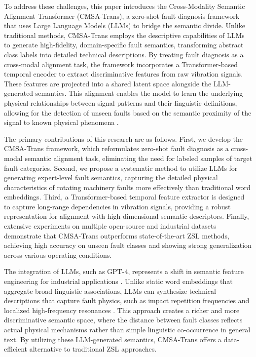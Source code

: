 To address these challenges, this paper introduces the Cross-Modality Semantic Alignment Transformer (CMSA-Trans), a zero-shot fault diagnosis framework that uses Large Language Models (LLMs) to bridge the semantic divide. Unlike traditional methods, CMSA-Trans employs the descriptive capabilities of LLMs to generate high-fidelity, domain-specific fault semantics, transforming abstract class labels into detailed technical descriptions. By treating fault diagnosis as a cross-modal alignment task, the framework incorporates a Transformer-based temporal encoder to extract discriminative features from raw vibration signals. These features are projected into a shared latent space alongside the LLM-generated semantics. This alignment enables the model to learn the underlying physical relationships between signal patterns and their linguistic definitions, allowing for the detection of unseen faults based on the semantic proximity of the signal to known physical phenomena \cite{vaswani2017attention, radford2021learning}.

The primary contributions of this research are as follows. First, we develop the CMSA-Trans framework, which reformulates zero-shot fault diagnosis as a cross-modal semantic alignment task, eliminating the need for labeled samples of target fault categories. Second, we propose a systematic method to utilize LLMs for generating expert-level fault semantics, capturing the detailed physical characteristics of rotating machinery faults more effectively than traditional word embeddings. Third, a Transformer-based temporal feature extractor is designed to capture long-range dependencies in vibration signals, providing a robust representation for alignment with high-dimensional semantic descriptors. Finally, extensive experiments on multiple open-source and industrial datasets demonstrate that CMSA-Trans outperforms state-of-the-art ZSL methods, achieving high accuracy on unseen fault classes and showing strong generalization across various operating conditions.

The integration of LLMs, such as GPT-4, represents a shift in semantic feature engineering for industrial applications \cite{bubeck2023sparks}. Unlike static word embeddings that aggregate broad linguistic associations, LLMs can synthesize technical descriptions that capture fault physics, such as impact repetition frequencies and localized high-frequency resonances \cite{brown2020language}. This approach creates a richer and more discriminative semantic space, where the distance between fault classes reflects actual physical mechanisms rather than simple linguistic co-occurrence in general text. By utilizing these LLM-generated semantics, CMSA-Trans offers a data-efficient alternative to traditional ZSL approaches.

